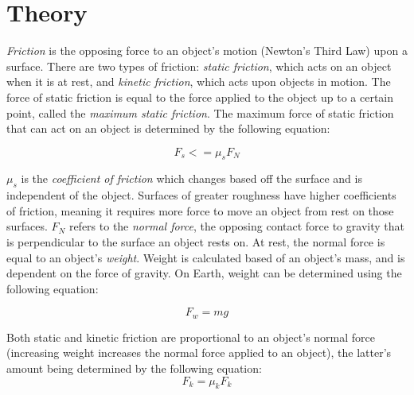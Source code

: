 \section{Theory}
\vspace{-0.5cm}
\singlespacing

\textit{Friction} is the opposing force to an object's motion (Newton's Third Law) upon a surface. There are two types of friction: \textit{static friction}, which acts on an object when it is at rest, and \textit{kinetic friction}, which acts upon objects in motion. The force of static friction is equal to the force applied to the object up to a certain point, called the \textit{maximum static friction}. The maximum force of static friction that can act on an object is determined by the following equation:

\begin{equation}
	F_s <= 	\mu_s F_N
	\label{eq:maxS}
\end{equation}

$\mu_s$ is the \textit{coefficient of friction} which changes based off the surface and is independent of the object. Surfaces of greater roughness have higher coefficients of friction, meaning it requires more force to move an object from rest on those surfaces. $F_N$ refers to the \textit{normal force}, the opposing contact force to gravity that is perpendicular to the surface an object rests on. At rest, the normal force is equal to an object's \textit{weight}. Weight is calculated based of an object's mass, and is dependent on the force of gravity. On Earth, weight can be determined using the following equation: 

\begin{equation}
	F_w = mg	
	\label{eq:weight}
\end{equation}

Both static and kinetic friction are proportional to an object's normal force (increasing weight increases the normal force applied to an object), the latter's amount being determined by the following equation:
\begin{equation}
	F_k = \mu_k F_k
	\label{eq:maxK}
\end{equation}

\newpage

